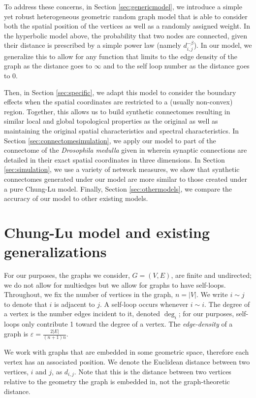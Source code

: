 \documentclass[11]{article}
\newcommand{\varep}{\varepsilon}
\theoremstyle{remark}
\theoremstyle{definition}
\begin{document}
To address these concerns, in Section \ref{sec:genericmodel}, we introduce a simple yet robust heterogeneous geometric random graph model that is able to consider both the spatial position of the vertices as well as a randomly assigned weight. In the hyperbolic model above, the probability that two nodes are connected, given their distance is prescribed by a simple power law (namely $d_{i,j}^{-\beta}$). In our model, we generalize this to allow for any function that limits to the edge density of the graph as the distance goes to $\infty$ and to the self loop number as the distance goes to $0$. 

Then, in Section \ref{sec:specific}, we adapt this model to consider the boundary effects when the spatial coordinates are restricted to a (usually non-convex) region. Together, this allows us to build synthetic connectomes resulting in similar local and global topological properties as the original as well as maintaining the original spatial characteristics and spectral characteristics.  In Section \ref{sec:connectomesimulation}, we apply our model to part of the connectome of the {\it Drosophila medulla} given in \cite{naturenetwork} wherein synaptic connections are detailed in their exact spatial coordinates in three dimensions. In Section \ref{sec:simulation}, we use a variety of network measures, we show that synthetic connectomes generated under our model are more similar to those created under a pure Chung-Lu model. Finally, Section \ref{sec:othermodels}, we compare the accuracy of our model to other existing models.

\section{Chung-Lu model and existing generalizations \label{sec:litreview}}

For our purposes, the graphs we consider, $G = (V, E)$, are finite and undirected; we do not allow for multiedges but we allow for graphs to have self-loops. Throughout, we fix the number of vertices in the graph, $n = |V|$. We write $i \sim j$ to denote that $i$ is adjacent to $j$. A self-loop occurs whenever $i\sim i$. The degree of a vertex is the number edges incident to it, denoted $\deg_i$; for our purposes, self-loops only contribute 1 toward the degree of a vertex. The {\it edge-density} of a graph is $\varep = \frac{2|E|}{(n+1)n}$.

We work with graphs that are embedded in some geometric space, therefore each vertex has an associated position. We denote the Euclidean distance between two vertices, $i$ and $j$, as $d_{i,j}$. Note that this is the distance between two vertices relative to the geometry the graph is embedded in, not the graph-theoretic distance. 
\end{document}
